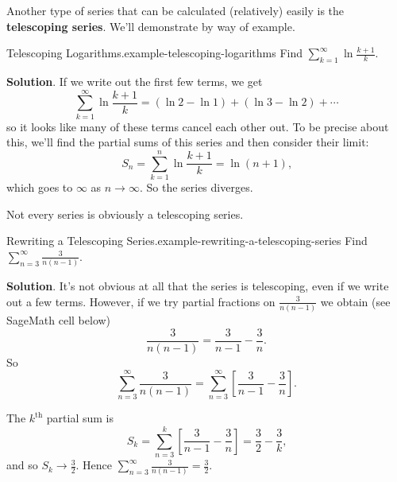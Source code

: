 \documentclass[10pt,]{book}
\newcommand{\terminology}[1]{\textbf{#1}}
\numberwithin{equation}{section}
\begin{document}
\hypertarget{p-852}{}%
Another type of series that can be calculated (relatively) easily is the \terminology{telescoping series}. We'll demonstrate by way of example.%
\begin{example}{Telescoping Logarithms.}{example-telescoping-logarithms}%
\hypertarget{p-853}{}%
Find \(\sum_{k=1}^{\infty}\ln\frac{k + 1}{k}\).%
\par\smallskip%
\noindent\textbf{Solution}.\hypertarget{solution-177}{}\quad%
\hypertarget{p-854}{}%
If we write out the first few terms, we get%
\begin{equation*}
\sum_{k=1}^{\infty}\ln\frac{k + 1}{k} = (\ln2 - \ln 1) + (\ln3 - \ln2) + \cdots
\end{equation*}
so it looks like many of these terms cancel each other out. To be precise about this, we'll find the partial sums of this series and then consider their limit:%
\begin{equation*}
S_{n} = \sum_{k=1}^{n}\ln\frac{k+1}{k} = \ln(n + 1)\text{,}
\end{equation*}
which goes to \(\infty\) as \(n\to\infty\). So the series diverges.%
\end{example}
\hypertarget{p-855}{}%
Not every series is obviously a telescoping series.%
\begin{example}{Rewriting a Telescoping Series.}{example-rewriting-a-telescoping-series}%
\hypertarget{p-856}{}%
Find \(\sum_{n=3}^{\infty}\frac{3}{n(n-1)}\).%
\par\smallskip%
\noindent\textbf{Solution}.\hypertarget{solution-178}{}\quad%
\hypertarget{p-857}{}%
It's not obvious at all that the series is telescoping, even if we write out a few terms. However, if we try partial fractions on \(\frac{3}{n(n-1)}\) we obtain (see SageMath cell below)%
\begin{equation*}
\frac{3}{n(n-1)} = \frac{3}{n - 1} - \frac{3}{n}\text{.}
\end{equation*}
So%
\begin{equation*}
\sum_{n=3}^{\infty}\frac{3}{n(n-1)} = \sum_{n=3}^{\infty}\left[\frac{3}{n-1} - \frac{3}{n}\right]\text{.}
\end{equation*}
%
\par
\hypertarget{p-858}{}%
The \(k^{\text{th}}\) partial sum is%
\begin{equation*}
S_{k} = \sum_{n=3}^{k}\left[\frac{3}{n-1} - \frac{3}{n}\right] = \frac{3}{2} - \frac{3}{k}\text{,}
\end{equation*}
and so \(S_{k}\to \frac{3}{2}\). Hence \(\sum_{n=3}^{\infty}\frac{3}{n(n-1)} = \frac{3}{2}\).%
\end{example}
\end{document}
